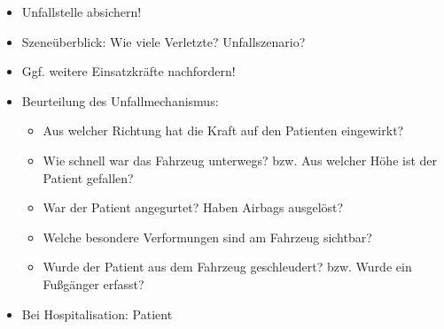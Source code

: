 \label{m:am-unfaelle}
\begin{itemize}
  \item Unfallstelle absichern!
  \item Szeneüberblick: Wie viele Verletzte? Unfallszenario?
  \item Ggf. weitere Einsatzkräfte nachfordern!
  \item Beurteilung des Unfallmechanismus:
  \begin{itemize}
    \item Aus welcher Richtung hat die Kraft auf den Patienten eingewirkt?
    \item Wie schnell war das Fahrzeug unterwegs? bzw. Aus
    welcher Höhe ist der Patient gefallen?
    \item War der Patient angegurtet? Haben Airbags
    ausgelöst?
    \item Welche besondere Verformungen sind am Fahrzeug
    sichtbar?
    \item Wurde der Patient aus dem Fahrzeug geschleudert?
    bzw. Wurde ein Fußgänger erfasst?
  \end{itemize}
  \item Bei Hospitalisation: Patient 
\end{itemize}